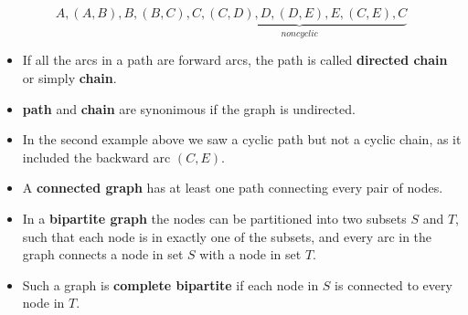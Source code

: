 \documentclass[c]{beamer}
\begin{document}
\begin{frame}
  \begin{center}
\end{center}
\[A,(A,B),B,(B,C),\underbrace{C,(C,D),D,(D,E),E,(C,E),C}_{noncyclic}\]

\end{frame}

\begin{frame}
  \begin{itemize}
    \item If all the arcs in a path are forward arcs, the path is called {\bf directed chain} or simply {\bf chain}.
    \item {\bf path} and {\bf chain} are synonimous if the graph is undirected.
    \item In the second example above we saw a cyclic path but not a cyclic chain, as it included the backward arc $(C,E)$.
    \item A {\bf connected graph} has at least one path connecting every pair of nodes.
    \item In a {\bf bipartite graph} the nodes can be partitioned into two subsets $S$ and $T$, such that each node is in exactly one of the subsets, and every arc in the graph connects a node in set $S$ with a node in set $T$.
    \item Such a graph is {\bf complete bipartite} if each node in $S$ is connected to every node in $T$.
  \end{itemize}
\end{frame}
\end{document}
